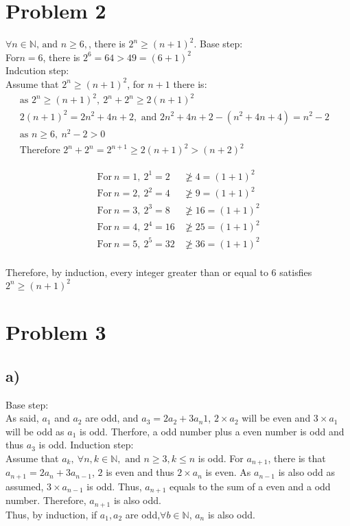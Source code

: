 \documentclass{article}
\begin{document}
\section*{Problem 2}
    \(\forall n\in \mathbb{N}\text{, and }n\geqslant 6, \), there is \(2^n\geqslant(n+1)^2\).
    Base step:\\
    For\(n=6\), there is \(2^6=64>49=(6+1)^2\) \\
    Indcution step:\\
    Assume that \(2^n\geqslant(n+1)^2\), for \(n+1\) there is:\\
    \begin{align*}
        \text{as  } 2^n\geqslant(n+1)^2,\  2^n+2^n\geqslant 2(n+1)^2&\\
        2(n+1)^2=2n^2+4n+2, \text{ and } 2n^2+4n+2-(n^2+4n+4)=n^2-2\\
        \text{as }n\geqslant 6,\ n^2-2>0\\
        \text {Therefore }  2^n+2^n=2^{n+1}\geqslant2(n+1)^2>(n+2)^2
    \end{align*}
    
    \begin{align*}
        \text {For}\ n=1, \ 2^1=2&\ngeq 4=(1+1)^2\\
        \text {For}\ n=2, \ 2^2=4&\ngeq 9=(1+1)^2\\
        \text {For}\ n=3, \ 2^3=8&\ngeq 16=(1+1)^2\\
        \text {For}\ n=4, \ 2^4=16&\ngeq 25=(1+1)^2\\
        \text {For}\ n=5, \ 2^5=32&\ngeq 36=(1+1)^2\\
    \end{align*}
    
    Therefore, by induction, every integer greater than or equal to 6 satisfies \(2^n\geqslant(n+1)^2\)
\section*{Problem 3}
    \subsection*{a)}
        Base step:\\
        As said, \(a_1\) and \(a_2\) are odd, and \(a_3=2a_{2}+3a_n{1}\), \(2\times a_{2}\) will be even and \(3 \times a_1\) will be odd as \(a_1\) is odd.
        Therfore, a odd number plus a even number is odd and thus \(a_3\) is odd.
        Induction step:\\
        Assume that \(a_k,\ \forall n,k\in \mathbb{N}, \text{ and } n\geqslant 3, k\leqslant n\) is odd. For \(a_{n+1}\),
        there is that \(a_{n+1}=2a_n+3a_{n-1}\), \(2\) is even and thus \(2\times a_{n}\) is even. As
        \(a_{n-1}\) is also odd as assumed, \(3\times a_{n-1}\) is odd. Thus, \(a_{n+1}\) equals to the sum
        of a even and a odd number. Therefore, \(a_{n+1}\) is also odd.\\
        Thus, by induction, if \(a_1,a_2\) are odd,\(\forall b\in \mathbb{N}\), \(a_n\) is also odd.
    \newpage
\end{document}
